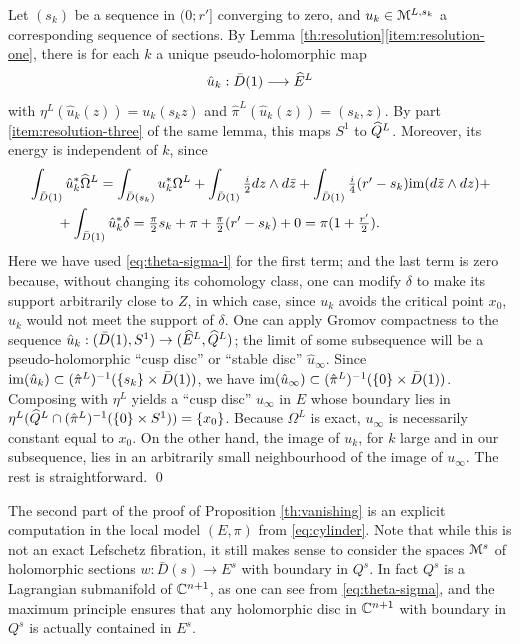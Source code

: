 \documentclass[10pt,letterpaper]{article}
\begin{document}
\proof Let $(s_k)$ be a sequence in $(0;r']$ converging to zero, and $u_k \in
\mathcal{M}^{L,s_k}$ a corresponding sequence of sections. By Lemma
\ref{th:resolution}\ref{item:resolution-one}, there is for each $k$ a unique
pseudo-holomorphic map \[\hat{u}_k: \bar{D}(1) \longrightarrow \widehat{E}^L\] with
$\eta^L(\hat{u}_k(z)) = u_k(s_kz)$ and $\hat{\pi}^L(\hat{u}_k(z)) = (s_k,z)$.
By part \ref{item:resolution-three} of the same lemma, this maps $S^1$ to
$\widehat{Q}^L$. Moreover, its energy is independent of $k$, since
\begin{align*}
 & \int_{\bar{D}(1)} \hat{u}_k^*\widehat{\Omega}^L
 = \int_{\bar{D}(s_k)} u_k^*\Omega^L + \int_{\bar{D}(1)}
 {\textstyle \frac{i}{2} dz \wedge d\bar{z}} + \int_{\bar{D}(1)}
 {\textstyle \frac{i}{4} (r'-s_k) \mathrm{im}(d\bar{z} \wedge dz)} +
 \\ & \qquad + \int_{\bar{D}(1)}
 \hat{u}^*_k\delta
 = {\textstyle \frac{\pi}{2}} s_k + \pi +
 {\textstyle \frac{\pi}{2}}(r'-s_k) + 0 = \pi(1 + \textstyle\frac{r'}{2}).
\end{align*}
Here we have used \eqref{eq:theta-sigma-l} for the first term; and the last
term is zero because, without changing its cohomology class, one can modify
$\delta$ to make its support arbitrarily close to $Z$, in which case, since
$u_k$ avoids the critical point $x_0$, $\hat{u}_k$ would not meet the support
of $\delta$. One can apply Gromov compactness to the sequence $\hat{u}_k:
(\bar{D}(1), S^1) \rightarrow (\widehat{E}^L,\widehat{Q}^L)$; the limit of some subsequence
will be a pseudo-holomorphic ``cusp disc'' or ``stable disc'' $\hat{u}_\infty$.
Since $\mathrm{im}(\hat{u}_k) \subset (\hat\pi^L)^{-1}(\{s_k\} \times \bar{D}(1))$, we
have $\mathrm{im}(\hat{u}_\infty) \subset (\hat\pi^L)^{-1}(\{0\} \times \bar{D}(1))$.
Composing with $\eta^L$ yields a ``cusp disc'' $u_\infty$ in $E$ whose boundary
lies in $\eta^L(\widehat{Q}^L \cap (\hat{\pi}^L)^{-1}(\{0\} \times S^1)) = \{x_0\}$.
Because $\Omega^L$ is exact, $u_\infty$ is necessarily constant equal to $x_0$.
On the other hand, the image of $u_k$, for $k$ large and in our subsequence,
lies in an arbitrarily small neighbourhood of the image of $u_\infty$. The rest
is straightforward. \qed

The second part of the proof of Proposition \ref{th:vanishing} is an explicit
computation in the local model $(E,\pi)$ from \eqref{eq:cylinder}. Note that
while this is not an exact Lefschetz fibration, it still makes sense to
consider the spaces $\mathcal{M}^s$ of holomorphic sections $w: \bar{D}(s) \rightarrow
E^s$ with boundary in $Q^s$. In fact $Q^s$ is a Lagrangian submanifold of
$\mathbb{C}^{n+1}$, as one can see from \eqref{eq:theta-sigma}, and the maximum
principle ensures that any holomorphic disc in $\mathbb{C}^{n+1}$ with boundary in
$Q^s$ is actually contained in $E^s$.
\end{document}
